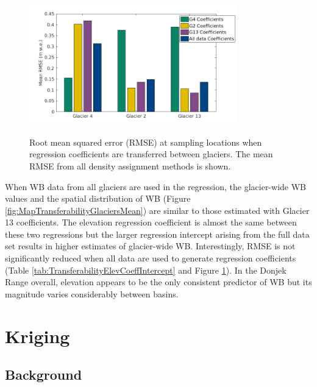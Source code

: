\documentclass{sfuthesis}
\begin{document}
{\begin{figure}[H]
	\centering
	\includegraphics[width =0.8\textwidth]{TransferabilityRMSE.png}\\
	\caption[Root mean squared error (RMSE) at sampling locations when regression coefficients are transferred between glaciers]{Root mean squared error (RMSE) at sampling locations when regression coefficients are transferred between glaciers. The mean RMSE from all density assignment methods is shown.}
	\label{fig:TransferabilityRMSE}
\end{figure}

When WB data from all glaciers are used in the regression, the glacier-wide WB values and the spatial distribution of WB (Figure \ref{fig:MapTransferabilityGlaciersMean}) are similar to those estimated with Glacier 13 coefficients. The elevation regression coefficient is almost the same between these two regressions but the larger regression intercept arising from the full data set results in higher estimates of glacier-wide WB. Interestingly, RMSE is not significantly reduced when all data are used to generate regression coefficients (Table \ref{tab:TransferabilityElevCoeffIntercept} and Figure \ref{fig:TransferabilityRMSE}). In the Donjek Range overall, elevation appears to be the only consistent predictor of WB but its magnitude varies considerably between basins. 


\section{Kriging}
\label{sec:kriging}

\subsection{Background}

}
\end{document}
